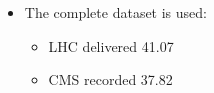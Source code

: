 \begin{itemize}%
\item The complete \PPCollisionsThirteenTeV dataset is used:
  \begin{itemize}
  \item LHC delivered 41.07 \sInvFb
  \item CMS recorded 37.82 \sInvFb
  \end{itemize}
\end{itemize}

